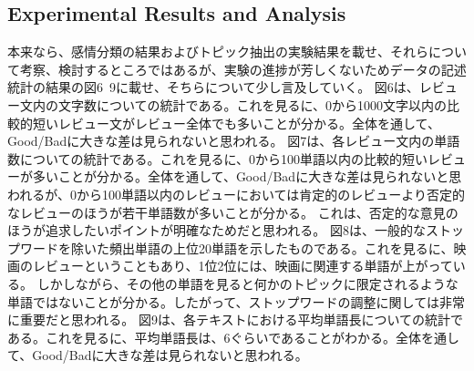 \documentclass[uplatex]{jsarticle}
\begin{document}
\subsection{Experimental Results and Analysis}
本来なら、感情分類の結果およびトピック抽出の実験結果を載せ、それらについて考察、検討するところではあるが、実験の進捗が芳しくないためデータの記述統計の結果の図6~9に載せ、そちらについて少し言及していく。
図6は、レビュー文内の文字数についての統計である。これを見るに、0から1000文字以内の比較的短いレビュー文がレビュー全体でも多いことが分かる。全体を通して、Good/Badに大きな差は見られないと思われる。
図7は、各レビュー文内の単語数についての統計である。これを見るに、0から100単語以内の比較的短いレビューが多いことが分かる。全体を通して、Good/Badに大きな差は見られないと思われるが、0から100単語以内のレビューにおいては肯定的のレビューより否定的なレビューのほうが若干単語数が多いことが分かる。
これは、否定的な意見のほうが追求したいポイントが明確なためだと思われる。
図8は、一般的なストップワードを除いた頻出単語の上位20単語を示したものである。これを見るに、映画のレビューということもあり、1位2位には、映画に関連する単語が上がっている。
しかしながら、その他の単語を見ると何かのトピックに限定されるような単語ではないことが分かる。したがって、ストップワードの調整に関しては非常に重要だと思われる。
図9は、各テキストにおける平均単語長についての統計である。これを見るに、平均単語長は、6ぐらいであることがわかる。全体を通して、Good/Badに大きな差は見られないと思われる。
\end{document}
